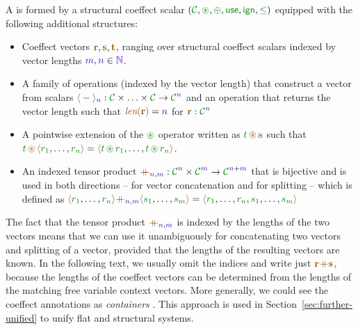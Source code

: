 \begin{definition}
A \emph{} is formed by a structural coeffect scalar
$(\C, \cseq, \cpar, \cunit, \czero, \cleq)$ equipped with the following additional structures:

\begin{itemize}
\vspace{-0.3em}
\item Coeffect vectors $\aclrd{\textbf{r}}, \aclrd{\textbf{s}}, \aclrd{\textbf{t}}$, ranging over
  structural coeffect scalars indexed by vector lengths $\sclrd{m}, \sclrd{n} \in \sclrd{\mathbb{N}}$.

\vspace{-0.3em}
\item A family of operations (indexed by the vector length) that construct a vector from scalars
  $\alift{-}_{\sclrd{n}} : \C \times \ldots \times \C \rightarrow \C^{\sclrd{n}}$
  and an operation that returns the vector length such that
  $\alen{\aclrd{\textbf{r}}} = \sclrd{n}$ for $\aclrd{\textbf{r}} : \C^{\sclrd{n}}$

\vspace{-0.3em}
\item A pointwise extension of the $\cseq$ operator written as $\cclrd{t} \,\aseq\, \aclrd{\textbf{s}}$
  such that\\ $\cclrd{t} \,\aseq\, \alift{\cclrd{r_1}, \ldots, \cclrd{r_n}} =
    \alift{\cclrd{t} \,\cseq\,\cclrd{r_1}, \ldots, \cclrd{t} \,\cseq\,\cclrd{r_n}}$.

\vspace{-0.3em}
\item An indexed tensor product $\atimes_{\sclrd{n},\sclrd{m}} : \C^{\sclrd{n}} \times \C^{\sclrd{m}} \rightarrow \C^{\sclrd{n}+\sclrd{m}}$
  that is bijective and is used in both directions -- for vector concatenation and for splitting --
  which is defined as $\alift{\cclrd{r_1}, \ldots, \cclrd{r_n}}
     \atimes_{\sclrd{n}, \sclrd{m}} \alift{\cclrd{s_1}, \ldots, \cclrd{s_m}}
   = \alift{\cclrd{r_1}, \ldots, \cclrd{r_n}, \cclrd{s_1}, \ldots, \cclrd{s_m}}$
\end{itemize}
\end{definition}

\noindent
The fact that the tensor product $\atimes_{\sclrd{n},\sclrd{m}}$ is indexed by the lengths
of the two vectors means that we can use it unambiguously for concatenating two vectors and
splitting of a vector, provided that the lengths of the resulting vectors are known.
In the following text, we usually omit the indices and write just
$\aclrd{\textbf{r}} \atimes \aclrd{\textbf{s}}$, because the lengths of the coeffect vectors
can be determined from the lengths of the matching free variable context vectors.
More generally, we could see the coeffect annotations as \emph{containers}
\cite{types-containers}. This approach is used in Section~\ref{sec:further-unified} to unify flat
and structural systems.

